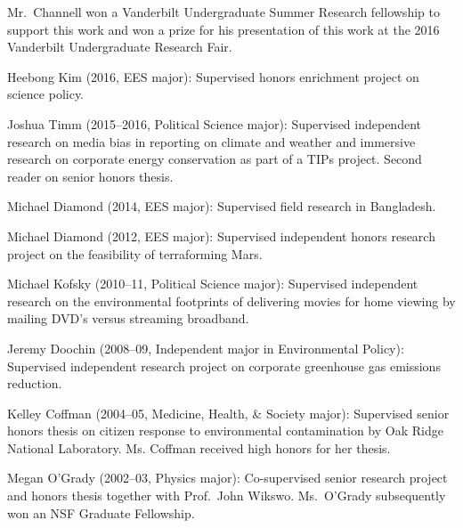Mr.~Channell won a Vanderbilt Undergraduate Summer Research fellowship to support this work and won a prize for his presentation of this work at the 2016 Vanderbilt Undergraduate Research Fair.
\item Heebong Kim (2016, EES major): Supervised honors enrichment project on science policy.
\item Joshua Timm (2015--2016, Political Science major): Supervised independent research on media bias in reporting on climate and weather and immersive research on corporate energy conservation as part of a TIPs project. Second reader on senior honors thesis.
\item Michael Diamond (2014, EES major): Supervised field research in Bangladesh.
\item Michael Diamond (2012, EES major): Supervised independent honors research project on the feasibility of terraforming Mars.
\item Michael Kofsky (2010--11, Political Science major): Supervised independent research on the environmental footprints of delivering movies for home viewing by mailing DVD's versus streaming broadband.
\item Jeremy Doochin (2008--09, Independent major in Environmental Policy): Supervised independent research project on corporate greenhouse gas emissions reduction.
\item Kelley Coffman (2004--05, Medicine, Health, \& Society major): Supervised senior honors thesis on citizen response to environmental contamination by Oak Ridge National Laboratory. Ms. Coffman received high honors for her thesis.
\item Megan O'Grady (2002--03, Physics major): Co-supervised senior research project and honors thesis together with Prof.~John Wikswo. Ms.~O'Grady subsequently won an NSF Graduate Fellowship.
